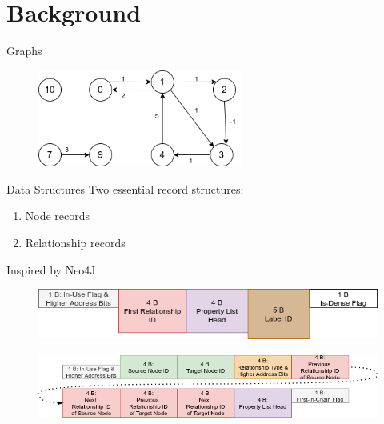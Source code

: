 \documentclass[rgb]{beamer}
\begin{document}
    \section{Background}
        \begin{frame}{Graphs}
            \begin{figure}
                \begin{center}
                \includegraphics[keepaspectratio, height=0.8\textheight, width=0.6\textwidth]{img/data_struct_gr.png}
                \end{center}
            \end{figure}
        \end{frame}
        
         \begin{frame}[allowframebreaks]{Data Structures}
            Two essential record structures: \\ [2em]
            \begin{enumerate}
            \item Node records \\ [2em]
            \item Relationship records \\ [3em]
            \end{enumerate}
            Inspired by Neo4J
            
            \framebreak
            \begin{figure}
                \begin{center}
                \includegraphics[keepaspectratio, height=\textheight, width=\textwidth]{img/node_record.png}
                \end{center}
            \end{figure}
            
            \framebreak
            \begin{figure}
                \begin{center}
                \includegraphics[keepaspectratio, height=\textheight, width=\textwidth]{img/relationship_record.png}
                \end{center}
            \end{figure}
        \end{frame}
        
\end{document}
